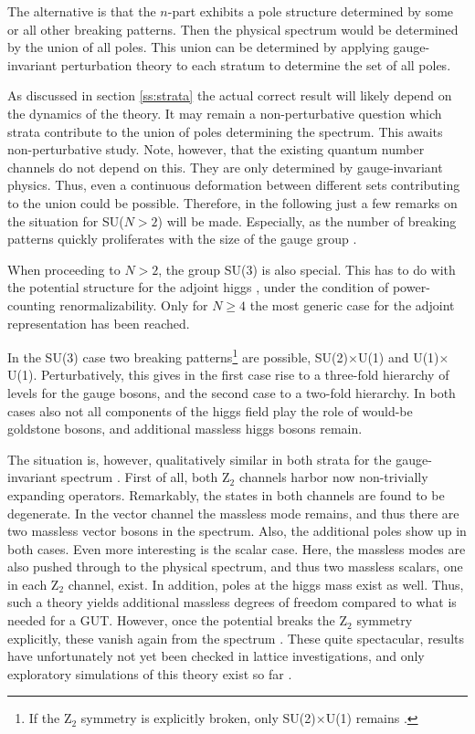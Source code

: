 \documentclass[final,twoside,12pt]{article}
\newcommand*{\1}{1\!\!\!\bot}
\begin{document}
The alternative is that the $n$-part exhibits a pole structure determined by some or all other breaking patterns. Then the physical spectrum would be determined by the union of all poles. This union can be determined by applying gauge-invariant perturbation theory to each stratum to determine the set of all poles.

As discussed in section \ref{ss:strata} the actual correct result will likely depend on the dynamics of the theory. It may remain a non-perturbative question which strata contribute to the union of poles determining the spectrum. This awaits non-perturbative study. Note, however, that the existing quantum number channels do not depend on this. They are only determined by gauge-invariant physics. Thus, even a continuous deformation between different sets contributing to the union could be possible. Therefore, in the following just a few remarks on the situation for SU($N>2$) will be made. Especially, as the number of breaking patterns quickly proliferates with the size of the gauge group \cite{Li:1973mq,Ruegg:1980gf,Murphy:1983rf,O'Raifeartaigh:1986vq,Kojima:2016fvv,Maas:2017xzh}.

When proceeding to $N>2$, the group SU(3) is also special. This has to do with the potential structure for the adjoint higgs \cite{O'Raifeartaigh:1986vq,Maas:2017xzh}, under the condition of power-counting renormalizability. Only for $N\ge 4$ the most generic case for the adjoint representation has been reached.

In the SU(3) case two breaking patterns\footnote{If the Z$_2$ symmetry is explicitly broken, only SU(2)$\times$U(1) remains \cite{O'Raifeartaigh:1986vq}.} are possible, SU(2)$\times$U(1) and U(1)$\times$U(1). Perturbatively, this gives in the first case rise to a three-fold hierarchy of levels for the gauge bosons, and the second case to a two-fold hierarchy. In both cases also not all components of the higgs field play the role of would-be goldstone bosons, and additional massless higgs bosons remain.

The situation is, however, qualitatively similar in both strata for the gauge-invariant spectrum \cite{Maas:2017xzh}. First of all, both Z$_2$ channels harbor now non-trivially expanding operators. Remarkably, the states in both channels are found to be degenerate. In the vector channel the massless mode remains, and thus there are two massless vector bosons in the spectrum. Also, the additional poles show up in both cases. Even more interesting is the scalar case. Here, the massless modes are also pushed through to the physical spectrum, and thus two massless scalars, one in each Z$_2$ channel, exist. In addition, poles at the higgs mass exist as well. Thus, such a theory yields additional massless degrees of freedom compared to what is needed for a GUT. However, once the potential breaks the Z$_2$ symmetry explicitly, these vanish again from the spectrum \cite{Maas:2017xzh}. These quite spectacular, results have unfortunately not yet been checked in lattice investigations, and only exploratory simulations of this theory exist so far \cite{Gupta:1983zv,Kikugawa:1985ex}.
\end{document}

